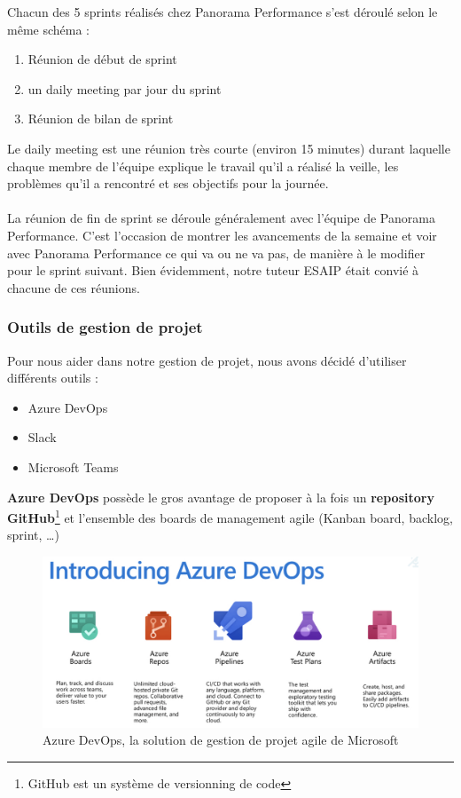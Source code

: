 Chacun des 5 sprints réalisés chez Panorama Performance s'est déroulé selon le même schéma : 
\begin{enumerate}
    \item Réunion de début de sprint
    \item un daily meeting par jour du sprint
    \item Réunion de bilan de sprint
\end{enumerate}

Le daily meeting est une réunion très courte (environ 15 minutes) durant laquelle chaque membre de l'équipe explique le travail qu'il a réalisé la veille, les problèmes qu'il a rencontré et ses objectifs pour la journée.\\
\hfill \\
La réunion de fin de sprint se déroule généralement avec l'équipe de Panorama Performance. C'est l'occasion de montrer les avancements de la semaine et voir avec Panorama Performance ce qui va ou ne va pas, de manière à le modifier pour le sprint suivant. Bien évidemment, notre tuteur ESAIP était convié à chacune de ces réunions.


\clearpage
\subsubsection*{Outils de gestion de projet}

Pour nous aider dans notre gestion de projet, nous avons décidé d'utiliser différents outils :
\begin{itemize}
    \item Azure DevOps
    \item Slack
    \item Microsoft Teams
\end{itemize}

\textbf{Azure DevOps} possède le gros avantage de proposer à la fois un \textbf{repository GitHub\cite{GitHub}}\footnote{GitHub est un système de versionning de code} et l'ensemble des boards de management agile (Kanban board, backlog, sprint, \dots)\\

\begin{figure}[!h]
    \centering
    \includegraphics[scale=0.4]{img/azure.png}
    \caption{Azure DevOps, la solution de gestion de projet agile de Microsoft}
    \label{fig:my_label}
\end{figure}

